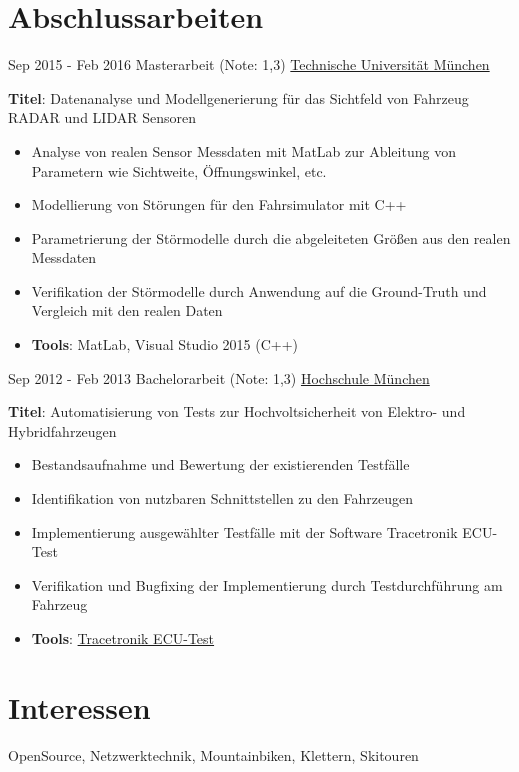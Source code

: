 \documentclass[a4paper]{twentysecondcv} %
\begin{document}
\section{Abschlussarbeiten}
\begin{twenty}
	\twentyitem
    	{Sep 2015 -}
		{Feb 2016}
        {Masterarbeit (Note: 1,3)}
        {\href{https://www.tum.de/}{Technische Universität München}}
        {}
        {
       	\textbf{Titel}: Datenanalyse und Modellgenerierung für das Sichtfeld von Fahrzeug RADAR und LIDAR Sensoren
        {\begin{itemize}
        \item Analyse von realen Sensor Messdaten mit MatLab zur Ableitung von Parametern wie Sichtweite, Öffnungswinkel, etc.
        \item Modellierung von Störungen für den Fahrsimulator mit C++
        \item Parametrierung der Störmodelle durch die abgeleiteten Größen aus den realen Messdaten
        \item Verifikation der Störmodelle durch Anwendung auf die Ground-Truth und Vergleich mit den realen Daten
        \item \textbf{Tools}: MatLab, Visual Studio 2015 (C++) \vspace{2mm}
		\end{itemize}}
        }
    \twentyitem
    {Sep 2012 -}
    {Feb 2013}
    {Bachelorarbeit (Note: 1,3)}
    {\href{https://www.hm.edu/}{Hochschule München}}
    {}
    {
    	\textbf{Titel}: Automatisierung von Tests zur Hochvoltsicherheit von Elektro- und Hybridfahrzeugen
    	{\begin{itemize}
    			\item Bestandsaufnahme und Bewertung der existierenden Testfälle
    			\item Identifikation von nutzbaren Schnittstellen zu den Fahrzeugen
    			\item Implementierung ausgewählter Testfälle mit der Software Tracetronik ECU-Test
    			\item Verifikation und Bugfixing der Implementierung durch Testdurchführung am Fahrzeug
    			\item \textbf{Tools}: \href{https://www.tracetronic.de/produkte/ecu-test/}{Tracetronik ECU-Test} \vspace{2mm}
    	\end{itemize}}
    }
\end{twenty}

\section{Interessen}
OpenSource, Netzwerktechnik, Mountainbiken, Klettern, Skitouren
\end{document}
